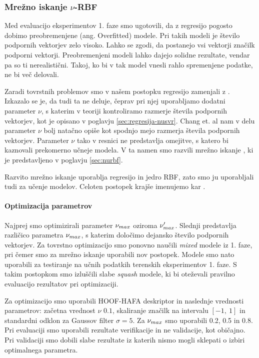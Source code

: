 \subsubsection{Mrežno iskanje \texorpdfstring{$\nu$}{nu}-RBF}
Med evaluacijo eksperimentov 1. faze smo ugotovili, da z regresijo \esvr pogosto dobimo preobremenjene (ang. Overfitted) modele. Pri takih modeli je število podpornih vektorjev zelo visoko. Lahko se zgodi, da postanejo vsi vektorji značilk podporni vektorji. Preobremenjeni modeli lahko dajejo solidne rezultate, vendar pa so ti nerealistični. Takoj, ko bi v tak model vnesli rahlo spremenjene podatke, ne bi več delovali.

Zaradi tovrstnih problemov smo v našem postopku regresijo \esvr zamenjali z \nusvr. Izkazalo se je, da tudi ta ne deluje, čeprav pri njej uporabljamo dodatni parameter $\nu$, s katerim v teoriji kontroliramo razmerje števila podpornih vektorjev, kot je opisano v poglavju \ref{sec:regresija-nusvr}. Chang et. al nam v delu \cite{chang2002training} parameter $\nu$ bolj natačno opiše kot spodnjo mejo razmerja števila podpornih vektorjev. Parameter $\nu$ tako v resnici ne predstavlja omejitve, s katero bi kaznovali prekomerno učneje modela. V ta namen smo razvili mrežno iskanje \nurbf, ki je predstavljeno v poglavju \ref{sec:nurbf}. 

Razvito mrežno iskanje uporablja regresijo \nusvr in jedro RBF, zato smo ju uporabljali tudi za učenje modelov. Celoten postopek krajše imenujemo kar \nurbf.


\paragraph{Optimizacija parametrov}
Najprej smo optimizirali parameter $\nu_{max}$ oziroma $\nu_{max}'$. Slednji predstavlja različico parametra $\nu_{max}$, s katerim določimo dejansko število podpornih vektorjev. Za tovrstno optimizacijo smo ponovno naučili \textit{mixed} modele iz 1. faze, pri čemer smo za mrežno iskanje uporabili nov postopek. Modele smo nato uporabili za testiranje na učnih podatkih terenskih eksperimentov 1. faze. S takim postopkom smo izluščili slabe \textit{squash} modele, ki bi oteževali pravilno evaluacijo rezultatov pri optimizaciji.

Za optimizacijo smo uporabili HOOF-HAFA deskriptor in naslednje vrednosti parametrov: začetna vrednost $\nu$ $0.1$, skaliranje značilk na intervalu $[-1,~1]$ in standardni odklon za Gaussov filter $\sigma=5$. Za $\nu_{max}$ smo uporabili \num{0.2}, \num{0.5} in \num{0.8}. Pri evaluaciji smo uporabili rezultate verifikacije in ne validacije, kot običajno. Pri validaciji smo dobili slabe rezultate iz katerih nismo mogli sklepati o izbiri optimalnega parametra.

